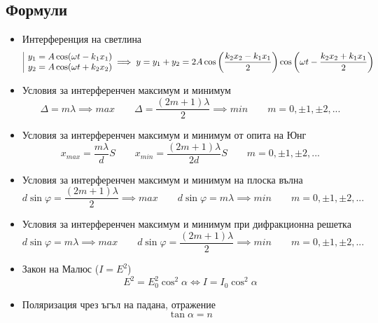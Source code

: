 \documentclass[fleqn, 12pt]{article}
\theoremstyle{definition}
\begin{document}
\subsection{Формули}
\begin{itemize}
\item Интерференция на светлина
$$\begin{array}{|l@{}} 
y_1 = A \cos (\omega t - k_1x_1)\\ 
y_2 = A \cos (\omega t + k_2x_2)
 \end{array} \implies y = y_1 + y_2 = 
2A\cos \left( \frac{k_2x_2 - k_1x_1}{2} \right) \cos \left( \omega t - \frac{k_2x_2 + k_1x_1}{2} \right) $$
\item Условия за интерференчен максимум и минимум
$$\Delta = m\lambda \implies max \qquad \Delta = \frac{(2m+1)\lambda}{2} \implies min \qquad m = 0, \pm1, \pm 2, ...$$
\item Условия за интерференчен максимум и минимум от опита на Юнг
$$ x_{max} = \frac{m\lambda}{d}S \qquad x_{min} = \frac{(2m+1)\lambda}{2d}S  \qquad m = 0, \pm1, \pm 2, ...$$
\item Условия за интерференчен максимум и минимум на плоска вълна
$$d\sin\varphi = \frac{(2m+1)\lambda}{2} \implies max \qquad d\sin\varphi = m\lambda \implies min \qquad m = 0, \pm1, \pm 2, ...$$
\item Условия за интерференчен максимум и минимум при дифракционна решетка
$$d\sin\varphi =  m\lambda \implies max \qquad d\sin\varphi = \frac{(2m+1)\lambda}{2} \implies min \qquad m = 0, \pm1, \pm 2, ...$$
\item Закон на Малюс ($I = E^2$)
$$E^2 = E^2_0 \cos^2 \alpha \Leftrightarrow I = I_0 \cos^2 \alpha$$
\item Поляризация чрез ъгъл на падана, отражение
$$\tan \alpha = n$$
\end{itemize}
\end{document}
